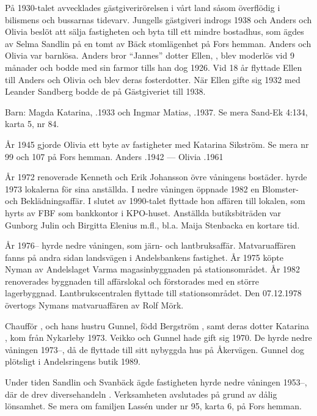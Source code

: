 På 1930-talet avvecklades gästgiverirörelsen i vårt land såsom överflödig	i bilismens och bussarnas tidevarv. Jungells gästgiveri indrogs 1938 och	Anders och Olivia beslöt att sälja fastigheten och byta till ett mindre	bostadhus, som ägdes av Selma Sandlin på en tomt av Bäck stomlägenhet på Fors hemman. Anders och Olivia var barnlösa. Anders bror ``Jannes'' 	dotter Ellen, , blev moderlös vid 9 månader och bodde med sin farmor tills han dog 1926. Vid 18 år flyttade Ellen till Anders och	Olivia och blev deras fosterdotter. När Ellen gifte sig 1932 med Leander Sandberg bodde de på Gästgiveriet till 1938.

Barn:	Magda Katarina,	.1933 och Ingmar Matias,	.1937.	Se mera Sand-Ek 4:134, karta 5, nr 84.

År 1945 gjorde Olivia ett byte av fastigheter med Katarina Sikström. Se	mera nr 99 och 107 på Fors hemman.
Anders .1942  ---  Olivia .1961


År 1972 renoverade Kenneth och Erik Johansson övre våningens bostäder.  hyrde 1973 lokalerna för sina anställda. I nedre våningen öppnade  1982 en Blomster- och	Beklädningsaffär. I slutet av 1990-talet flyttade hon affären till lokalen,	som hyrts av FBF som bankkontor i KPO-huset. Anställda butiksbiträden	var Gunborg Julin och Birgitta Elenius m.fl., bl.a. Maija Stenbacka en kortare tid.

År 1976-- hyrde  nedre våningen, som järn- och	lantbruksaffär. Matvaruaffären fanns på andra sidan landsvägen i	Andelsbankens fastighet. År 1975 köpte Nyman av Andelslaget Varma magasinbyggnaden på stationsområdet. År 1982 renoverades byggnaden till affärslokal och förstorades med en större lagerbyggnad. 	Lantbrukscentralen flyttade till stationsområdet. Den 07.12.1978 	övertogs Nymans matvaruaffären av Rolf Mörk.

Chaufför ,  och hans hustru Gunnel, född Bergström , samt deras dotter Katarina , kom från Nykarleby 1973. Veikko och Gunnel hade gift sig 1970. De hyrde nedre 	våningen 1973--, då de flyttade till sitt nybyggda hus på Åkervägen. Gunnel dog plötsligt i Andelsringens butik 1989.

Under tiden Sandlin och Svanbäck ägde fastigheten hyrde  nedre våningen 1953--, där de drev diversehandeln	. Verksamheten avslutades på grund av dålig lönsamhet. Se mera om familjen Lassén under nr 95, karta 6, på Fors hemman.

